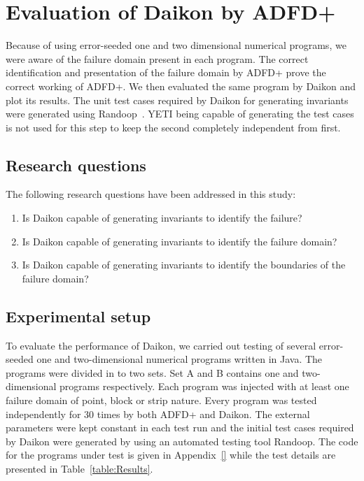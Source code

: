 

\section{Evaluation of Daikon by ADFD+}\label{sec:intro6_7}
Because of using error-seeded one and two dimensional numerical programs, we were aware of the failure domain present in each program. The correct identification and presentation of the failure domain by ADFD+ prove the correct working of ADFD+. We then evaluated the same program by Daikon and plot its results. The unit test cases required by Daikon for generating invariants were generated using Randoop~\cite{pacheco2007randoop}. YETI being capable of generating the test cases is not used for this step to keep the second completely independent from first. 

\subsection{Research questions}\label{sec:intro6_8}
The following research questions have been addressed in this study:
\begin{enumerate}
\item Is Daikon capable of generating invariants to identify the failure?
\item Is Daikon capable of generating invariants to identify the failure domain?
\item Is Daikon capable of generating invariants to identify the boundaries of the failure domain?
\end{enumerate}

\subsection{Experimental setup}\label{sec:intro6_9}
To evaluate the performance of Daikon, we carried out testing of several error-seeded one and two-dimensional numerical programs written in Java. The programs were divided in to two sets. Set A and B contains one and two-dimensional programs respectively. Each program was injected with at least one failure domain of point, block or strip nature. Every program was tested independently for 30 times by both ADFD+ and Daikon. The external parameters were kept constant in each test run and the initial test cases required by Daikon were generated by using an automated testing tool Randoop. The code for the programs under test is given in Appendix~\ref{} while the test details are presented in Table~\ref{table:Results}. 

